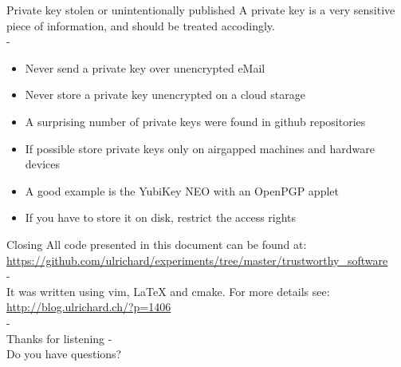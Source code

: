 \documentclass[11pt]{beamer}
\begin{document}
\begin{frame}{Private key stolen or unintentionally published}
A private key is a very sensitive piece of information, and should be treated accodingly.\\
-\\
\begin{itemize}
\item Never send a private key over unencrypted eMail %
\item Never store a private key unencrypted on a cloud starage
\item A surprising number of private keys were found in github repositories
\item If possible store private keys only on airgapped machines and hardware devices
\item A good example is the YubiKey NEO with an OpenPGP applet
\item If you have to store it on disk, restrict the access rights
\end{itemize}
\end{frame}

\begin{frame}{Closing}
All code presented in this document can be found at:\\
\url{https://github.com/ulrichard/experiments/tree/master/trustworthy\_software}\\
-\\
It was written using vim, LaTeX and cmake. For more details see:\\
\url{http://blog.ulrichard.ch/?p=1406}\\
-\\
Thanks for listening
-\\
Do you have questions?
\end{frame}
\end{document}
